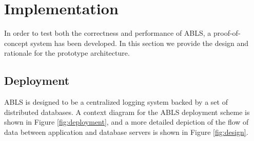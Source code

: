 \documentclass{sig-alternate}
\begin{document}

\section{Implementation}
In order to test both the correctness and performance of ABLS, a proof-of-concept system has been
developed. In this section we provide the design and rationale for the prototype architecture.

\subsection{Deployment}
\label{sec:deployment}
ABLS is designed to be a centralized logging system backed by a set of distributed databases. A context
diagram for the ABLS deployment scheme is shown in Figure \ref{fig:deployment}, and a more detailed
depiction of the flow of data between application and database servers is shown in Figure \ref{fig:design}.


\end{document}
